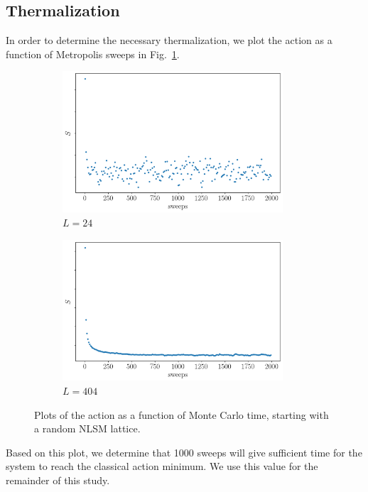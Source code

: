 \subsection{Thermalization}
\label{sec:thermalization}
In order to determine the necessary thermalization, we plot the action as a function of Metropolis sweeps in Fig.~\ref{fig:therm}.
\begin{figure}[h]
  \centering
      \begin{subfigure}[b]{0.5\textwidth}\centering
        \includegraphics[width=0.9\textwidth]{imgs/therm24.png}
        \caption{$L=24$}
      \end{subfigure}%
      \hfill
      \begin{subfigure}[b]{0.5\textwidth}\centering
        \includegraphics[width=0.9\textwidth]{imgs/therm404.png}
        \caption{$L=404$}
      \end{subfigure}
      \hfill
      \caption{\label{fig:therm} Plots of the action as a function of Monte Carlo time, starting with a random NLSM lattice.}
\end{figure}
Based on this plot, we determine that 1000 sweeps will give sufficient time for the system to reach the classical action minimum. We use this value for the remainder of this study.

